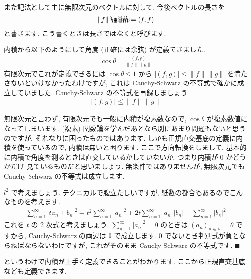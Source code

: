 \documentclass[openany, a4paper, oneside]{jsbook}
\makeatletter
\newcommand*{\defeq}{\mathrel{\rlap{%
\raisebox{0.3ex}{$\m@th\cdot$}}%
\raisebox{-0.3ex}{$\m@th\cdot$}}%
=}
\theoremstyle{break}
\theoremstyle{breakdefn}
\newcommand{\abs}[1]{\left|#1\right|}
\makeatother
\begin{document}
また記法として主に無限次元のベクトルに対して, 今後ベクトルの長さを
    \begin{align}
        \| f \| \defeq (f,f)
    \end{align}
と書きます. こう書くときは長さではなくと呼びます.

内積から以下のようにして角度 (正確には余弦) が定義できました.
\begin{align}
\cos \theta = \frac{(f,g)}{\| f \| \, \| g \|}
\end{align}
有限次元でこれが定義できるには $\cos \theta \leq 1$ から $|(f,g)| \leq \|f\| \, \|g \|$ を満たさないといけなかったわけですが,
これは Cauchy-Schwarz の不等式で確かに成立していました. Cauchy-Schwarz の不等式を再録しましょう.
\begin{align}
\abs{(f,g)} \leq \| f \| \, \| g \|
\end{align}

無限次元と言わず, 有限次元でも一般に内積が複素数なので,  $\cos \theta$ が複素数値になってしまいます.
(複素) 関数論を学んだあとなら別にあまり問題もないと思うのですが, それなりに困ったものではあります.
しかも正規直交基底の定義に内積を使っているので, 内積は無いと困ります.
ここで方向転換をしまして, 基本的に内積で角度を測るときは直交しているかしていないか, つまり内積が $0$ かどうかだけ
見ているものだと思いましょう.
無条件ではありませんが, 無限次元でも Cauchy-Schwarz の不等式は成立します.

 $l^2$ で考えましょう. テクニカルで腹立たしいですが, 紙数の都合もあるのでこんなものを考えます.
    \begin{align}
        \sum_{n=1}^{\infty} |ta_n + b_n|^2
        =
        t^2\sum_{n=1}^{\infty} |a_n|^2 + 2t \sum_{n=1}^{\infty} |a_n|\,|b_n| +\sum_{n=1}^{\infty} |b_n|^2
    \end{align}
これを $t$ の 2 次式と考えましょう.  $\sum_{n=1}^{\infty} |a_n|^2=0$ のときは $(a_n)_{n \in \mathbb{N}}=\theta$ ですから,
Cauchy-Schwarz の両辺は $0$ で成立します.  $0$ でないとき判別式が負とならねばならないわけですが, これがそのまま
Cauchy-Schwarz の不等式です.  $\blacksquare$

というわけで内積が上手く定義できることがわかります.
ここから正規直交基底なども定義できます.
\end{document}
